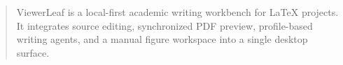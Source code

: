 \begin{abstract}
ViewerLeaf is a local-first academic writing workbench for LaTeX projects. It integrates source editing, synchronized PDF preview, profile-based writing agents, and a manual figure workspace into a single desktop surface.
\end{abstract}
